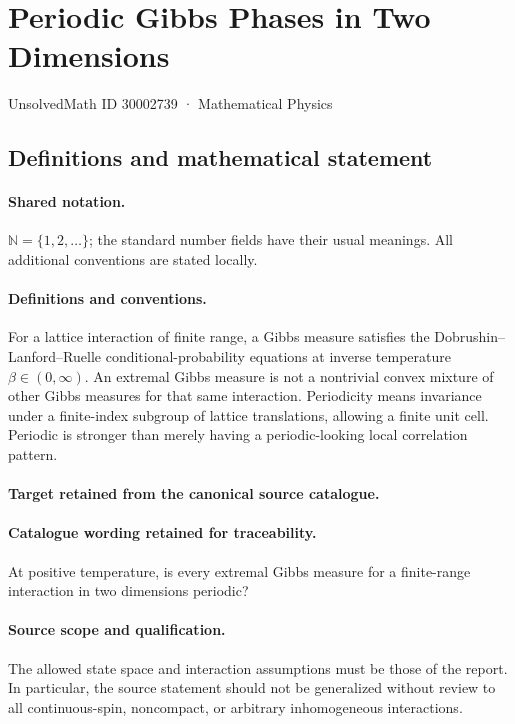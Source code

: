 \documentclass[11pt]{article}
\begin{document}
\setcounter{section}{30002738}
\section{Periodic Gibbs Phases in Two Dimensions}\label{30002739}
{\small UnsolvedMath ID 30002739 · Mathematical Physics}
\subsection{Definitions and mathematical statement}

\paragraph{Shared notation.}$\mathbb N=\{1,2,\ldots\}$; the standard number fields have their usual meanings. All additional conventions are stated locally.


\paragraph{Definitions and conventions.}
For a lattice interaction of finite range, a Gibbs measure satisfies the Dobrushin--Lanford--Ruelle conditional-probability equations at inverse temperature $\beta\in(0,\infty)$. An extremal Gibbs measure is not a nontrivial convex mixture of other Gibbs measures for that same interaction. Periodicity means invariance under a finite-index subgroup of lattice translations, allowing a finite unit cell. Periodic is stronger than merely having a periodic-looking local correlation pattern.

\paragraph{Target retained from the canonical source catalogue.}
\paragraph{Catalogue wording retained for traceability.}
At positive temperature, is every extremal Gibbs measure for a finite-range interaction in two dimensions periodic?

\paragraph{Source scope and qualification.}
The allowed state space and interaction assumptions must be those of the report. In particular, the source statement should not be generalized without review to all continuous-spin, noncompact, or arbitrary inhomogeneous interactions.
\end{document}
